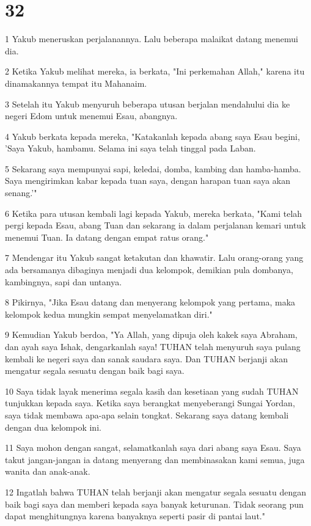 \chapter{32}

\par 1 Yakub meneruskan perjalanannya. Lalu beberapa malaikat datang menemui dia.
\par 2 Ketika Yakub melihat mereka, ia berkata, "Ini perkemahan Allah," karena itu dinamakannya tempat itu Mahanaim.
\par 3 Setelah itu Yakub menyuruh beberapa utusan berjalan mendahului dia ke negeri Edom untuk menemui Esau, abangnya.
\par 4 Yakub berkata kepada mereka, "Katakanlah kepada abang saya Esau begini, 'Saya Yakub, hambamu. Selama ini saya telah tinggal pada Laban.
\par 5 Sekarang saya mempunyai sapi, keledai, domba, kambing dan hamba-hamba. Saya mengirimkan kabar kepada tuan saya, dengan harapan tuan saya akan senang.'"
\par 6 Ketika para utusan kembali lagi kepada Yakub, mereka berkata, "Kami telah pergi kepada Esau, abang Tuan dan sekarang ia dalam perjalanan kemari untuk menemui Tuan. Ia datang dengan empat ratus orang."
\par 7 Mendengar itu Yakub sangat ketakutan dan khawatir. Lalu orang-orang yang ada bersamanya dibaginya menjadi dua kelompok, demikian pula dombanya, kambingnya, sapi dan untanya.
\par 8 Pikirnya, "Jika Esau datang dan menyerang kelompok yang pertama, maka kelompok kedua mungkin sempat menyelamatkan diri."
\par 9 Kemudian Yakub berdoa, "Ya Allah, yang dipuja oleh kakek saya Abraham, dan ayah saya Ishak, dengarkanlah saya! TUHAN telah menyuruh saya pulang kembali ke negeri saya dan sanak saudara saya. Dan TUHAN berjanji akan mengatur segala sesuatu dengan baik bagi saya.
\par 10 Saya tidak layak menerima segala kasih dan kesetiaan yang sudah TUHAN tunjukkan kepada saya. Ketika saya berangkat menyeberangi Sungai Yordan, saya tidak membawa apa-apa selain tongkat. Sekarang saya datang kembali dengan dua kelompok ini.
\par 11 Saya mohon dengan sangat, selamatkanlah saya dari abang saya Esau. Saya takut jangan-jangan ia datang menyerang dan membinasakan kami semua, juga wanita dan anak-anak.
\par 12 Ingatlah bahwa TUHAN telah berjanji akan mengatur segala sesuatu dengan baik bagi saya dan memberi kepada saya banyak keturunan. Tidak seorang pun dapat menghitungnya karena banyaknya seperti pasir di pantai laut."

